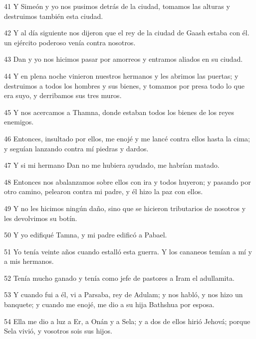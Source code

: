 \par 41 Y Simeón y yo nos pusimos detrás de la ciudad, tomamos las alturas y destruimos también esta ciudad.

\par 42 Y al día siguiente nos dijeron que el rey de la ciudad de Gaash estaba con él. un ejército poderoso venía contra nosotros.

\par 43 Dan y yo nos hicimos pasar por amorreos y entramos aliados en su ciudad.

\par 44 Y en plena noche vinieron nuestros hermanos y les abrimos las puertas; y destruimos a todos los hombres y sus bienes, y tomamos por presa todo lo que era suyo, y derribamos sus tres muros.

\par 45 Y nos acercamos a Thamna, donde estaban todos los bienes de los reyes enemigos.

\par 46 Entonces, insultado por ellos, me enojé y me lancé contra ellos hasta la cima; y seguían lanzando contra mí piedras y dardos.

\par 47 Y si mi hermano Dan no me hubiera ayudado, me habrían matado.

\par 48 Entonces nos abalanzamos sobre ellos con ira y todos huyeron; y pasando por otro camino, pelearon contra mi padre, y él hizo la paz con ellos.

\par 49 Y no les hicimos ningún daño, sino que se hicieron tributarios de nosotros y les devolvimos su botín.

\par 50 Y yo edifiqué Tamna, y mi padre edificó a Pabael.

\par 51 Yo tenía veinte años cuando estalló esta guerra. Y los cananeos temían a mí y a mis hermanos.

\par 52 Tenía mucho ganado y tenía como jefe de pastores a Iram el adullamita.

\par 53 Y cuando fui a él, vi a Parsaba, rey de Adulam; y nos habló, y nos hizo un banquete; y cuando me enojé, me dio a su hija Bathshua por esposa.

\par 54 Ella me dio a luz a Er, a Onán y a Sela; y a dos de ellos hirió Jehová; porque Sela vivió, y vosotros sois sus hijos.

